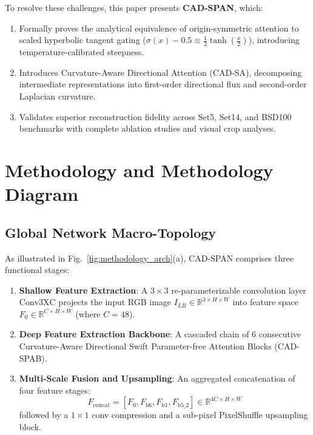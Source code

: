 \documentclass[conference]{IEEEtran}
\begin{document}
To resolve these challenges, this paper presents \textbf{CAD-SPAN}, which:
\begin{enumerate}
    \item Formally proves the analytical equivalence of origin-symmetric attention to scaled hyperbolic tangent gating ($\sigma(x) - 0.5 \equiv \frac{1}{2}\tanh(\frac{x}{2})$), introducing temperature-calibrated steepness.
    \item Introduces Curvature-Aware Directional Attention (CAD-SA), decomposing intermediate representations into first-order directional flux and second-order Laplacian curvature.
    \item Validates superior reconstruction fidelity across Set5, Set14, and BSD100 benchmarks with complete ablation studies and visual crop analyses.
\end{enumerate}



\section{Methodology and Methodology Diagram}

\subsection{Global Network Macro-Topology}
As illustrated in Fig.~\ref{fig:methodology_arch}(a), CAD-SPAN comprises three functional stages:
\begin{enumerate}
    \item \textbf{Shallow Feature Extraction}: A $3\times 3$ re-parameterizable convolution layer $\text{Conv3XC}$ projects the input RGB image $I_{LR} \in \mathbb{R}^{3 \times H \times W}$ into feature space $F_0 \in \mathbb{R}^{C \times H \times W}$ (where $C = 48$).
    \item \textbf{Deep Feature Extraction Backbone}: A cascaded chain of 6 consecutive Curvature-Aware Directional Swift Parameter-free Attention Blocks (CAD-SPAB).
    \item \textbf{Multi-Scale Fusion and Upsampling}: An aggregated concatenation of four feature stages:
    \begin{equation}
    F_{\text{concat}} = [F_0, F_{\text{b6}}, F_{\text{b1}}, F_{\text{b5\_2}}] \in \mathbb{R}^{4C \times H \times W}
    \end{equation}
    followed by a $1\times 1$ conv compression and a sub-pixel PixelShuffle upsampling block.
\end{enumerate}
\end{document}
